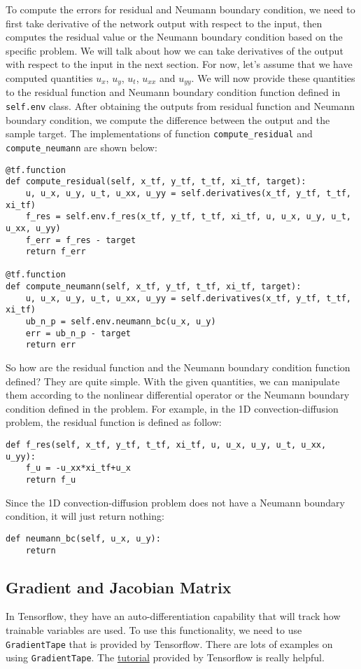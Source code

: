 \documentclass{article}
\begin{document}
To compute the errors for residual and Neumann boundary condition, we need to first take derivative of the network output with respect to the input, then computes the residual value or the Neumann boundary condition based on the specific problem. We will talk about how we can take derivatives of the output with respect to the input in the next section. For now, let's assume that we have computed quantities $u_x$, $u_y$, $u_t$, $u_{xx}$ and $u_{yy}$. We will now provide these quantities to the residual function and Neumann boundary condition function defined in \texttt{self.env} class. After obtaining the outputs from residual function and Neumann boundary condition, we compute the difference between the output and the sample target. The implementations of function \texttt{compute\_residual} and \texttt{compute\_neumann} are shown below:
\begin{lstlisting}
@tf.function
def compute_residual(self, x_tf, y_tf, t_tf, xi_tf, target):
	u, u_x, u_y, u_t, u_xx, u_yy = self.derivatives(x_tf, y_tf, t_tf, xi_tf)
	f_res = self.env.f_res(x_tf, y_tf, t_tf, xi_tf, u, u_x, u_y, u_t, u_xx, u_yy)
	f_err = f_res - target
	return f_err

@tf.function 
def compute_neumann(self, x_tf, y_tf, t_tf, xi_tf, target):
	u, u_x, u_y, u_t, u_xx, u_yy = self.derivatives(x_tf, y_tf, t_tf, xi_tf)
	ub_n_p = self.env.neumann_bc(u_x, u_y)
	err = ub_n_p - target
	return err
\end{lstlisting}

So how are the residual function and the Neumann boundary condition function defined? They are quite simple. With the given quantities, we can manipulate them according to the nonlinear differential operator or the Neumann boundary condition defined in the problem. For example, in the 1D convection-diffusion problem, the residual function is defined as follow:
\begin{lstlisting}
def f_res(self, x_tf, y_tf, t_tf, xi_tf, u, u_x, u_y, u_t, u_xx, u_yy):
	f_u = -u_xx*xi_tf+u_x
	return f_u
\end{lstlisting}
Since the 1D convection-diffusion problem does not have a Neumann boundary condition, it will just return nothing:
\begin{lstlisting}
def neumann_bc(self, u_x, u_y):
	return
\end{lstlisting}

\subsection{Gradient and Jacobian Matrix}
In Tensorflow, they have an auto-differentiation capability that will track how trainable variables are used. To use this functionality, we need to use \texttt{GradientTape} that is provided by Tensorflow. There are lots of examples on using \texttt{GradientTape}. The \href{https://www.tensorflow.org/guide/autodiff}{tutorial} provided by Tensorflow is really helpful. \\
\end{document}
